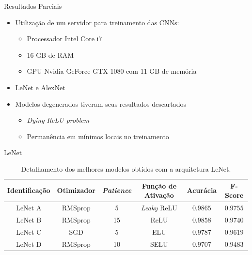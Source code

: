 
\begin{frame}{Resultados Parciais}
 \begin{itemize}
   \item Utilização de um servidor para treinamento das CNNs:
    \begin{itemize}
      \item Processador Intel Core i7
      \item 16 GB de RAM
      \item GPU Nvidia GeForce GTX 1080 com 11 GB de memória
    \end{itemize}
    \bigskip
    \item \alert{LeNet} e \alert{AlexNet}
    \bigskip
    \item Modelos degenerados tiveram seus resultados descartados
    \begin{itemize}
      \item \emph{Dying ReLU problem}
      \item Permanência em mínimos locais no treinamento
    \end{itemize}
   \end{itemize}
\end{frame}

\begin{frame}{LeNet}

  \begin{table}
  \centering
  \caption{Detalhamento dos melhores modelos obtidos com a arquitetura LeNet.}
  \label{tab:lenet}
  \begin{tabular}{cccccc}
  \toprule
  \textbf{Identificação} & \textbf{Otimizador} & \textbf{\emph{Patience}}  & \textbf{Função de Ativação} & \textbf{Acurácia} & \textbf{F-Score} \\
  \midrule
  LeNet A & RMSprop & 5 & \emph{Leaky} ReLU & $0.9865$ & $0.9755$ \\
  LeNet B & RMSprop & 15 & ReLU & $0.9858$ & $0.9740$\\
  LeNet C & SGD & 5 & ELU & $0.9787$ & $0.9619$ \\
  LeNet D & RMSprop & 10 & SELU & $0.9707$ & $0.9483$ \\
  \bottomrule
  \end{tabular}
  \end{table}

\end{frame}

